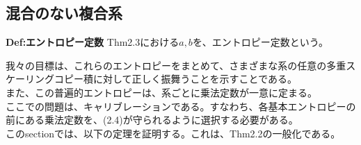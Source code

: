 \documentclass[a4paper,11pt]{jsarticle}
\begin{document}
\subsection{混合のない複合系}
\begin{itembox}[l]{\textbf{Def:エントロピー定数}}
    Thm2.3における$a,b$を、エントロピー定数という。
\end{itembox}
我々の目標は、これらのエントロピーをまとめて、さまざまな系の任意の多重スケーリングコピー積に対して正しく振舞うことを示すことである。\\
また、この普遍的エントロピーは、系ごとに乗法定数が一意に定まる。\\
ここでの問題は、キャリブレーションである。すなわち、各基本エントロピーの前にある乗法定数を、(2.4)が守られるように選択する必要がある。\\
このsectionでは、以下の定理を証明する。これは、Thm2.2の一般化である。\\
\end{document}
